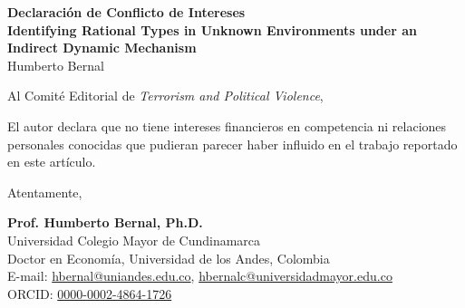 \documentclass[12pt]{article}
\begin{document}
\singlespacing

\begin{center}
\textbf{Declaración de Conflicto de Intereses} \\
\vspace{1em}
\textbf{Identifying Rational Types in Unknown Environments under an Indirect Dynamic Mechanism} \\
Humberto Bernal
\end{center}

\vspace{3em}

\noindent Al Comité Editorial de \textit{Terrorism and Political Violence},

\vspace{2em}

\noindent El autor declara que no tiene intereses financieros en competencia ni relaciones personales conocidas que pudieran parecer haber influido en el trabajo reportado en este artículo.

\vspace{4em}

\begin{flushleft}
Atentamente,

\vspace{3em}

\textbf{Prof. Humberto Bernal, Ph.D.} \\
Universidad Colegio Mayor de Cundinamarca \\
Doctor en Economía, Universidad de los Andes, Colombia \\
E-mail: \href{mailto:hbernal@uniandes.edu.co}{hbernal@uniandes.edu.co}, \href{mailto:hbernalc@universidadmayor.edu.co}{hbernalc@universidadmayor.edu.co} \\
ORCID: \href{https://orcid.org/0000-0002-4864-1726}{0000-0002-4864-1726}
\end{flushleft}
\end{document}
